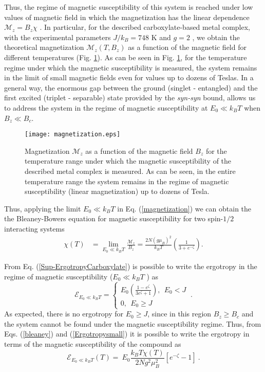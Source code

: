 \documentclass[aps,prl,epsfigure,twocolumn,superscriptaddress]{revtex4-1}
\newcommand{\Ecal}{\mathcal{E}}
\newcommand{\Mcal}{\mathcal{M}}
\newcommand{\1}{\mathbbm{1}}
\begin{document}
Thus, the regime of magnetic susceptibility of this system is reached under low values of magnetic field in which the magnetization has the linear dependence $\Mcal_z  = B_z \chi$ \cite{mario}. In particular, for the described carboxylate-based metal complex, with the experimental parameters $J/k_{B}\!=\! 748$ K  and $g = 2$ \cite{cruz}, we obtain the theoretical magnetization $\Mcal_z(T,B_z)$ as a function of the magnetic field for different temperatures (Fig. \ref{mag}). As can be seen in Fig. \ref{mag}, for the temperature regime under which the magnetic susceptibility is measured, the system remains in the limit of small magnetic fields even for values up to dozens of Teslas. In a general way, the enormous gap between the ground (singlet - entangled) and the first excited (triplet - separable) state provided by the \textit{syn-syn} bound, allows us to address the system in the regime of magnetic susceptibility at $E_0\ll k_{B}T$ when $B_z\ll B_c$.

\begin{figure}[!ht]
	\centering
	\texttt{[image: magnetization.eps]}
	\caption{Magnetization $\Mcal_z$ as a function of the magnetic field $B_z$ for the temperature range under which the magnetic susceptibility of the described metal complex is measured. As can be seen, in the entire temperature range the system remains in the regime of magnetic susceptibility (linear magnetization) up to dozens of Tesla.}
	\label{mag}
\end{figure}

Thus, applying the limit $E_0\ll k_{B}T$ in Eq. (\ref{magnetization}) we can obtain the the Bleaney-Bowers equation for magnetic susceptibility for two spin-$1/2$ interacting systems~\cite{bleaney1952anomalous}
\begin{align}
\chi(T) &=  \lim_{E_0\ll k_{B}T}\frac{\Mcal_z}{B_z}=\frac{2N(g\mu_B)^2}{k_B T}\left(\frac{1}{3+e^{-\zeta}}\right).
\label{bleaney}
\end{align}

From Eq. (\ref{Sup-ErgotropyCarboxylate}) is possible to write the ergotropy in the regime of magnetic susceptibility ($E_0\ll k_{B}T$ ) as
\begin{equation}
\Ecal_{E_0\ll k_{B}T}= \left\{
\begin{aligned}
E_{0} \left(\frac{1 - e^{{\zeta}}}{3e^{{\zeta}}+1}\right), ~~ E_{0}< {J} \\
0, ~~ E_{0}\geq {J}
\end{aligned}
\right.~.
\label{Ergotropysmall}
\end{equation}
As expected, there is no ergotropy for $E_{0}\geq {J}$, since in this region $B_{z}\geq B_{c}$ and the system cannot be found under the magnetic susceptibility regime. Thus, from Eqs. (\ref{bleaney}) and (\ref{Ergotropysmall}) it is possible to write the ergotropy in terms of the magnetic susceptibility of the compound as
\begin{equation}
\Ecal_{E_0\ll k_{B}T}(T)  = \
E_{0} \frac{k_BT\chi(T)}{2Ng^2\mu_B^2}\left[ e^{-\zeta} -1\right]~.
\label{Sup-Ergotropysus}
\end{equation}
\end{document}
